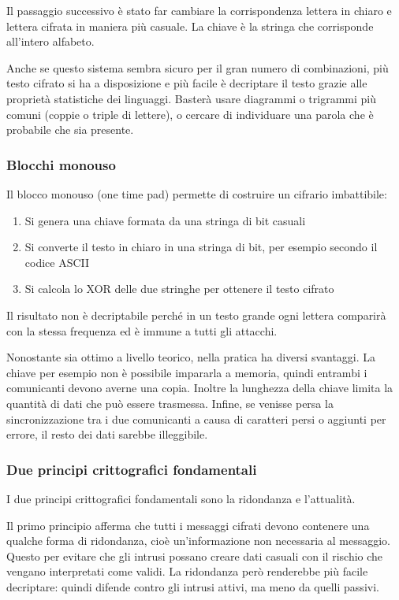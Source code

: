 Il passaggio successivo è stato far cambiare la corrispondenza lettera in chiaro e lettera cifrata in maniera più casuale.
La chiave è la stringa che corrisponde all'intero alfabeto.

Anche se questo sistema sembra sicuro per il gran numero di combinazioni, 
più testo cifrato si ha a disposizione e più facile è decriptare il testo grazie alle proprietà statistiche dei linguaggi.
Basterà usare diagrammi o trigrammi più comuni (coppie o triple di lettere), o cercare di individuare una parola che è probabile che sia presente.

\subsubsection{Blocchi monouso}
Il blocco monouso (one time pad) permette di costruire un cifrario imbattibile: 
\begin{enumerate}
\item Si genera una chiave formata da una stringa di bit casuali
\item Si converte il testo in chiaro in una stringa di bit, per esempio secondo il codice ASCII
\item Si calcola lo XOR delle due stringhe per ottenere il testo cifrato
\end{enumerate}
Il risultato non è decriptabile perché in un testo grande ogni lettera comparirà con la stessa frequenza ed è immune a tutti gli attacchi.

Nonostante sia ottimo a livello teorico, nella pratica ha diversi svantaggi.
La chiave per esempio non è possibile impararla a memoria, quindi entrambi i comunicanti devono averne una copia.
Inoltre la lunghezza della chiave limita la quantità di dati che può essere trasmessa.
Infine, se venisse persa la sincronizzazione tra i due comunicanti a causa di caratteri persi o aggiunti per errore, il resto dei dati sarebbe illeggibile.

\subsubsection{Due principi crittografici fondamentali}
I due principi crittografici fondamentali sono la ridondanza e l'attualità.

Il primo principio afferma che tutti i messaggi cifrati devono contenere una qualche forma di ridondanza, cioè un'informazione non necessaria al messaggio.
Questo per evitare che gli intrusi possano creare dati casuali con il rischio che vengano interpretati come validi.
La ridondanza però renderebbe più facile decriptare: quindi difende contro gli intrusi attivi, ma meno da quelli passivi. 

